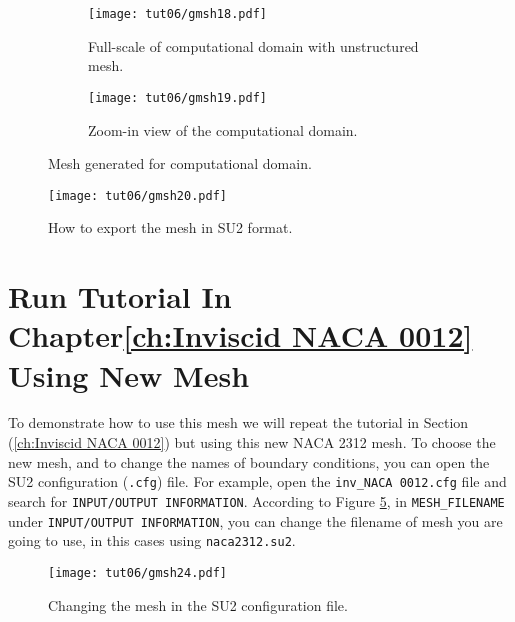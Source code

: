 \begin{figure}[ht]
    \centering
     \begin{subfigure}[b]{.5\textwidth}
         \centering
         \texttt{[image: tut06/gmsh18.pdf]}
         \caption{Full-scale of computational domain with unstructured mesh.}
         \label{fig6:gmsh18 a}
     \end{subfigure}
     \hfill
     \begin{subfigure}[b]{.5\textwidth}
         \centering
         \texttt{[image: tut06/gmsh19.pdf]}
         \caption{Zoom-in view of the computational domain.}
         \label{fig6:gmsh18 b}
     \end{subfigure}  
    \caption{Mesh generated for computational domain.}
    \label{fig6:gmsh18}
\end{figure}
\begin{figure}[H]
    \centering
    \texttt{[image: tut06/gmsh20.pdf]}
    \caption{How to export the mesh in SU2 format.}
    \label{fig6:gmsh20}
\end{figure}
\section{Run Tutorial In Chapter\ref{ch:Inviscid NACA 0012} Using New Mesh}
To demonstrate how to use this mesh we will repeat the tutorial in Section (\ref{ch:Inviscid NACA 0012}) but using this new NACA 2312 mesh. To choose the new mesh, and to change the names of boundary conditions, you can open the SU2 configuration (\texttt{.cfg}) file. For example, open the \texttt{inv\_NACA 0012.cfg} file and search for \texttt{INPUT/OUTPUT INFORMATION}. According to Figure \ref{fig6:gmsh24}, in \texttt{MESH\_FILENAME} under \texttt{INPUT/OUTPUT INFORMATION}, you can change the filename of mesh you are going to use, in this cases using \texttt{naca2312.su2}.
\begin{figure}[ht]
    \centering
    \texttt{[image: tut06/gmsh24.pdf]}
    \caption{Changing the mesh in the SU2 configuration file.}
    \label{fig6:gmsh24}
\end{figure}


